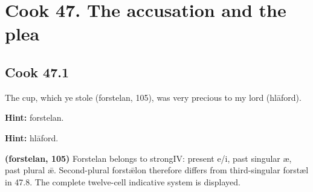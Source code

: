 \section*{Cook 47. The accusation and the plea}

\par\begin{minipage}{\linewidth}\raggedright
\subsection*{Cook 47.1}

The cup, which ye stole (forstelan, 105), was very precious to my lord (hlāford).

\textbf{Hint:} forstelan.

\textbf{Hint:} hlāford.

\textbf{(forstelan, 105)} Forstelan belongs to strongIV: present e/\allowbreak{}i, past singular æ, past plural ǣ. Second-plural forstǣlon therefore differs from third-singular forstæl in 47.8. The complete twelve-cell indicative system is displayed.

\end{minipage}\par\addvspace{4pt}

